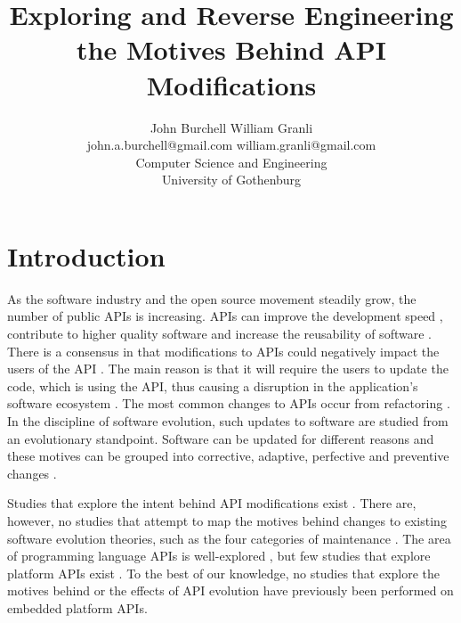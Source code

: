 \documentclass[10pt,twocolumn]{article}
\title{Exploring and Reverse Engineering the Motives Behind API Modifications}
\begin{document}
\author{John Burchell \qquad William Granli \\
		john.a.burchell@gmail.com \qquad william.granli@gmail.com \\
		Computer Science and Engineering  \\
		University of Gothenburg }


\maketitle





\section{Introduction}
As the software industry and the open source movement steadily grow, the number of public APIs is increasing. APIs can improve the development speed \cite{stylos2006comparing}, contribute to higher quality software \cite{stylos2006comparing} and increase the reusability of software \cite{afonso2012evaluating}. There is a consensus in that modifications to APIs could negatively impact the users of the API \cite{google_talk} \cite{mcdonnell2013empirical} \cite{robbes2012developers} \cite{henning2007api}. The main reason is that it will require the users to update the code, which is using the API, thus causing a disruption in the application's software ecosystem \cite{messerschmitt2005software}. The most common changes to APIs occur from refactoring \cite{dig2005role} \cite{xing2006refactoring}. 
In the discipline of software evolution, such updates to software are studied from an evolutionary standpoint. Software can be updated for different reasons and these motives can be grouped into corrective, adaptive, perfective and preventive changes \cite{lientz1980software}. 

Studies that explore the intent behind API modifications exist \cite{hou2011exploring}. There are, however, no studies that attempt to map the motives behind changes to existing software evolution theories, such as the four categories of maintenance \cite{lientz1980software}. The area of programming language APIs is well-explored \cite{hou2011exploring} \cite{shi2011empirical}, but few studies that explore platform APIs exist \cite{robbes2012developers}. To the best of our knowledge, no studies that explore the motives behind or the effects of API evolution have previously been performed on embedded platform APIs. 
\end{document}
